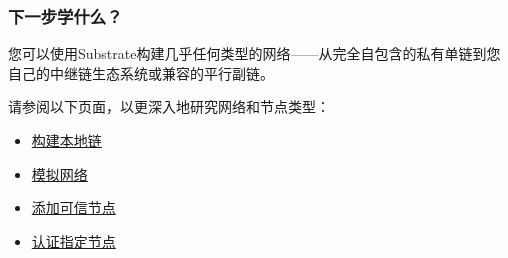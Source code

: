 \hypertarget{ux4e0bux4e00ux6b65ux5b66ux4ec0ux4e48}{%
\subsubsection{下一步学什么？}\label{ux4e0bux4e00ux6b65ux5b66ux4ec0ux4e48}}

您可以使用Substrate构建几乎任何类型的网络------从完全自包含的私有单链到您自己的中继链生态系统或兼容的平行副链。

请参阅以下页面，以更深入地研究网络和节点类型：

\begin{itemize}
\item
  \href{/tutorials/get-started/build-local-blockchain/}{构建本地链}
\item
  \href{/tutorials/get-started/simulate-network/}{模拟网络}
\item
  \href{/tutorials/get-started/add-trusted-nodes/}{添加可信节点}
\item
  \href{/tutorials/get-started/authorize-specific-nodes/}{认证指定节点}
\end{itemize}
